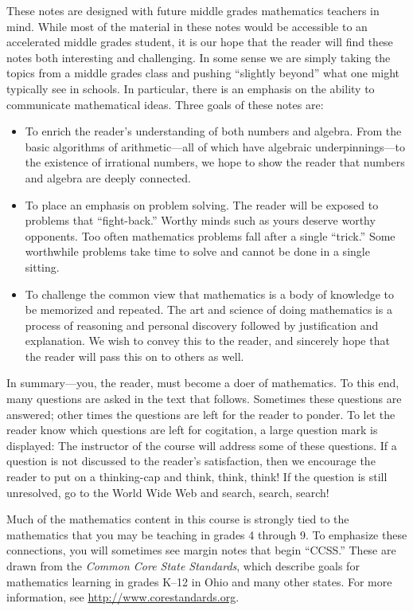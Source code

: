 These notes are designed with future middle grades mathematics
teachers in mind.  While most of the material in these notes would be
accessible to an accelerated middle grades student, it is our hope
that the reader will find these notes both interesting and
challenging.  In some sense we are simply taking the topics from a
middle grades class and pushing ``slightly beyond'' what one might
typically see in schools. In particular, there is an emphasis on the
ability to communicate mathematical ideas.  Three goals of these notes
are:
\begin{itemize}
\item To enrich the reader's understanding of both numbers and algebra. 
From the basic algorithms of arithmetic---all of which have algebraic
underpinnings---to the existence of irrational numbers, we hope to show
the reader that numbers and algebra are deeply connected.
\item To place an emphasis on problem solving. The reader will be exposed 
to problems that ``fight-back.'' Worthy minds such as yours deserve
worthy opponents. Too often mathematics problems fall after a single
``trick.'' Some worthwhile problems take time to solve and cannot be done
in a single sitting.
\item To challenge the common view that mathematics is a body of knowledge 
to be memorized and repeated. The art and science of doing mathematics
is a process of reasoning and personal discovery followed by
justification and explanation. We wish to convey this to the reader,
and sincerely hope that the reader will pass this on to others as
well.
\end{itemize}
In summary---you, the reader, must become a doer of mathematics.  To
this end, many questions are asked in the text that follows. Sometimes
these questions are answered; other times the questions are left for
the reader to ponder. To let the reader know which questions are left
for cogitation, a large question mark is displayed:
\QM
The instructor of the course will address some of these questions. If
a question is not discussed to the reader's satisfaction, then we
encourage the reader to put on a thinking-cap and think, think, think!
If the question is still unresolved, go to the World Wide Web and
search, search, search!

Much of the mathematics content in this course is 
strongly tied to the mathematics that you may be teaching in grades 4
through 9.  To emphasize these connections, you will sometimes
see margin notes that begin ``CCSS.''  These are drawn
from the \textit{Common Core State Standards}, which describe goals for 
mathematics learning in grades K--12 in Ohio and many other states.  
For more information, see \url{http://www.corestandards.org}.  

